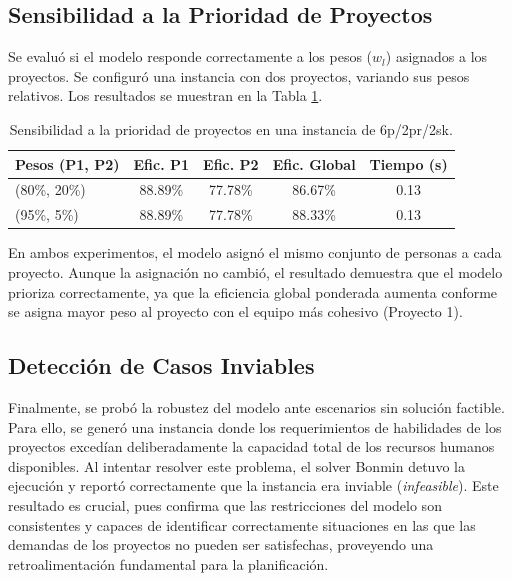 \documentclass[conference]{IEEEtran}
\begin{document}
\subsection{Sensibilidad a la Prioridad de Proyectos}
Se evaluó si el modelo responde correctamente a los pesos (\(w_l\)) asignados a los proyectos. Se configuró una instancia con dos proyectos, variando sus pesos relativos. Los resultados se muestran en la Tabla \ref{tab:sensibilidad}.

\begin{table}[htbp]
    \centering
    \caption{Sensibilidad a la prioridad de proyectos en una instancia de 6p/2pr/2sk.}
    \label{tab:sensibilidad}
    \begin{tabularx}{\linewidth}{@{}lcccc@{}}
        \toprule
        \textbf{Pesos (P1, P2)} & \textbf{Efic. P1} & \textbf{Efic. P2} & \textbf{Efic. Global} & \textbf{Tiempo (s)} \\
        \midrule
        (80\%, 20\%)            & 88.89\%           & 77.78\%           & 86.67\%               & 0.13                \\
        (95\%, 5\%)             & 88.89\%           & 77.78\%           & 88.33\%               & 0.13                \\
        \bottomrule
    \end{tabularx}
\end{table}

En ambos experimentos, el modelo asignó el mismo conjunto de personas a cada proyecto. Aunque la asignación no cambió, el resultado demuestra que el modelo prioriza correctamente, ya que la eficiencia global ponderada aumenta conforme se asigna mayor peso al proyecto con el equipo más cohesivo (Proyecto 1).

\subsection{Detección de Casos Inviables}
Finalmente, se probó la robustez del modelo ante escenarios sin solución factible. Para ello, se generó una instancia donde los requerimientos de habilidades de los proyectos excedían deliberadamente la capacidad total de los recursos humanos disponibles. Al intentar resolver este problema, el solver Bonmin detuvo la ejecución y reportó correctamente que la instancia era inviable (\textit{infeasible}). Este resultado es crucial, pues confirma que las restricciones del modelo son consistentes y capaces de identificar correctamente situaciones en las que las demandas de los proyectos no pueden ser satisfechas, proveyendo una retroalimentación fundamental para la planificación.
\end{document}
